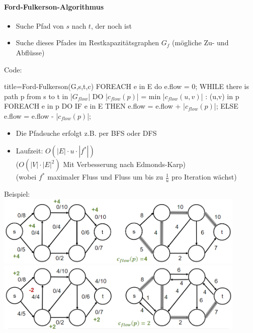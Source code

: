 \documentclass[
    ngerman,
    color=3b,
    dark_mode,
    load_common, %
    summary,
    boxarc,
]{tuda_summary}
\begin{document}
\paragraph{Ford-Fulkerson-Algorithmus}\mbox{}
\begin{idea}\mbox{}
    \begin{itemize}
        \item Suche Pfad von $s$ nach $t$, der noch  ist
        \item Suche dieses Pfades im Restkapazitätsgraphen $G_f$ (mögliche Zu- und Abflüsse)
    \end{itemize}
\end{idea}
Code:
\begin{codeBlock}[autogobble,escapeinside=||]{title={Ford-Fulkerson(G,s,t,c)}}
    FOREACH e in E do e.flow = 0;
    WHILE there is path p from s to t in |$G_{flow}$| DO
        |$c_{flow}(p)$| = min {|$c_{flow}(u,v)$| : (u,v) in p}
        FOREACH e in p DO
            IF e in E THEN
                e.flow = e.flow + |$c_{flow}(p)$|;
            ELSE
                e.flow = e.flow - |$c_{flow}(p)$|;
\end{codeBlock}
\begin{itemize}
    \item Die Pfadsuche erfolgt z.B. per BFS oder DFS
    \item Laufzeit: $O(|E| \cdot u \cdot |f^*|)$ \\
          ($O(|V| \cdot |E|^2)$ Mit Verbesserung nach Edmonds-Karp) \\
          (wobei $f^*$ maximaler Fluss und Fluss um bis zu $\frac{1}{u}$ pro Iteration wächst)
\end{itemize}
\clearpage
Beispiel:\\
\includegraphics[width=12cm]{pictures/fordbsp1.PNG}\\
\includegraphics[width=12cm]{pictures/fordbsp2.PNG}\\
\clearpage
\end{document}
